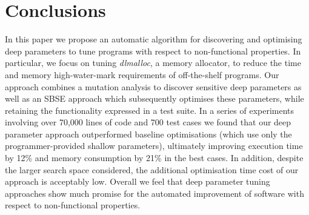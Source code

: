 \section{Conclusions}

In this paper we propose an automatic algorithm for discovering and
optimising deep parameters to tune programs with respect to non-functional
properties.  In particular, we focus on tuning \emph{dlmalloc}, a memory
allocator, to reduce the time and memory high-water-mark requirements of
off-the-shelf programs. Our approach combines a mutation analysis to
discover sensitive deep parameters as well as an SBSE approach which 
subsequently optimises these parameters, while retaining the functionality expressed in
a test suite.  In a series of experiments involving over 70,000 lines of
code and 700 test cases we found that our deep parameter approach
outperformed baseline optimisations (which use only the programmer-provided
shallow parameters), ultimately improving execution time by 12\% 
and memory consumption by 21\% in the best cases. In addition, despite
the larger search space considered, the additional optimisation time cost
of our approach is acceptably low. Overall we feel that deep parameter tuning 
approaches show much promise for the automated improvement of software
with respect to non-functional properties.  



